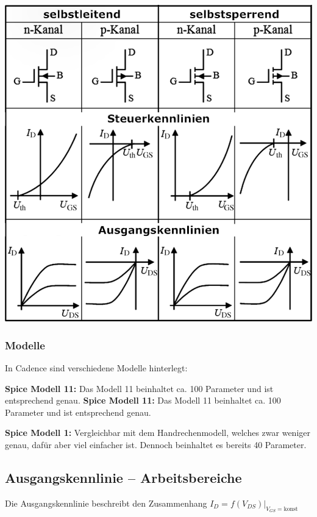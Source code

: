 \begin{minipage}[t]{0.5\columnwidth}
    \includegraphics[width=\columnwidth, align=t]{images/02_MOSFET_uebersicht.pdf}
\end{minipage}



\subsubsection{Modelle}
In Cadence sind verschiedene Modelle hinterlegt:

\textbf{Spice Modell 11:} Das Modell 11 beinhaltet ca. 100 Parameter und ist entsprechend genau.
\textbf{Spice Modell 11:} Das Modell 11 beinhaltet ca. 100 Parameter und ist entsprechend genau.

\textbf{Spice Modell 1:} Vergleichbar mit dem Handrechenmodell, welches zwar weniger genau, dafür aber viel einfacher ist. Dennoch beinhaltet es bereits 40 Parameter.

\subsection{Ausgangskennlinie -- Arbeitsbereiche}
 
Die Ausgangskennlinie beschreibt den Zusammenhang $I_D = f(V_{DS}) \big|_{V_{GS} = \text{konst}}$

